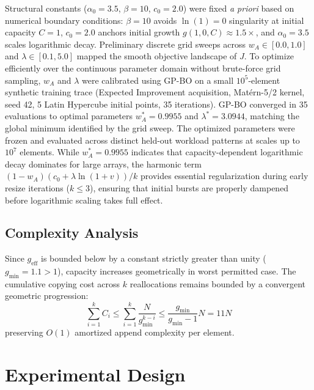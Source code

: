 \documentclass[conference]{IEEEtran}
\begin{document}
Structural constants ($\alpha_0 = 3.5$, $\beta = 10$, $c_0 = 2.0$) were fixed \textit{a priori} based on numerical boundary conditions: $\beta = 10$ avoids $\ln(1)=0$ singularity at initial capacity $C=1$, $c_0 = 2.0$ anchors initial growth $g(1, 0, C) \approx 1.5\times$, and $\alpha_0 = 3.5$ scales logarithmic decay. Preliminary discrete grid sweeps across $w_A \in [0.0, 1.0]$ and $\lambda \in [0.1, 5.0]$ mapped the smooth objective landscape of $J$. To optimize efficiently over the continuous parameter domain without brute-force grid sampling, $w_A$ and $\lambda$ were calibrated using GP-BO on a small $10^5$-element synthetic training trace (Expected Improvement acquisition, Matérn-5/2 kernel, seed 42, 5 Latin Hypercube initial points, 35 iterations). GP-BO converged in 35 evaluations to optimal parameters $w_A^* = 0.9955$ and $\lambda^* = 3.0944$, matching the global minimum identified by the grid sweep. The optimized parameters were frozen and evaluated across distinct held-out workload patterns at scales up to $10^7$ elements. While $w_A^* = 0.9955$ indicates that capacity-dependent logarithmic decay dominates for large arrays, the harmonic term $(1-w_A)(c_0 + \lambda \ln(1+v))/k$ provides essential regularization during early resize iterations ($k \le 3$), ensuring that initial bursts are properly dampened before logarithmic scaling takes full effect.

\subsection{Complexity Analysis}
Since $g_{\text{eff}}$ is bounded below by a constant strictly greater than unity ($g_{\min} = 1.1 > 1$), capacity increases geometrically in worst permitted case. The cumulative copying cost across $k$ reallocations remains bounded by a convergent geometric progression:
\begin{equation}
    \sum_{i=1}^{k} C_i \le \sum_{i=1}^{k} \frac{N}{g_{\min}^{k-i}} \le \frac{g_{\min}}{g_{\min} - 1} N = 11N
\end{equation}
preserving $O(1)$ amortized append complexity per element.

\section{Experimental Design}
\end{document}
